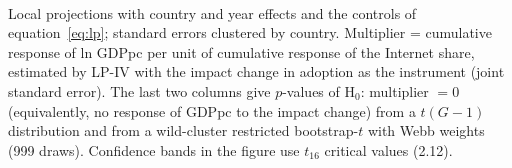 \\[3pt]\begin{minipage}{\tablewidth}\footnotesize Local projections with country and year effects and the controls of equation~\eqref{eq:lp}; standard errors clustered by country. Multiplier = cumulative response of ln GDPpc per unit of cumulative response of the Internet share, estimated by LP-IV with the impact change in adoption as the instrument (joint standard error). The last two columns give $p$-values of H$_0$: multiplier $=0$ (equivalently, no response of GDPpc to the impact change) from a $t(G-1)$ distribution and from a wild-cluster restricted bootstrap-$t$ with Webb weights (999 draws). Confidence bands in the figure use $t_{16}$ critical values (2.12).\end{minipage}
